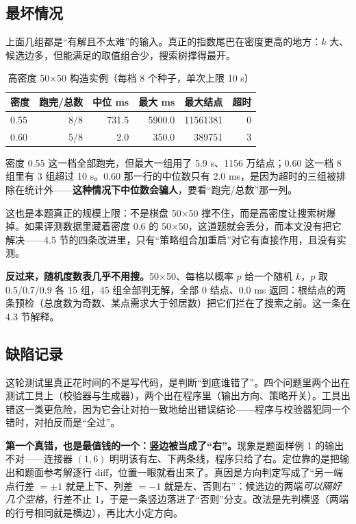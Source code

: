\documentclass[12pt,a4paper,fontset=windows]{ctexart}
\begin{document}
\subsection{最坏情况}

上面几组都是“有解且不太难”的输入。真正的指数尾巴在密度更高的地方：$k$ 大、候选边多，但能满足的取值组合少，搜索树撑得最开。

\begin{table}[htbp]
\centering
\caption{高密度 50×50 构造实例（每档 8 个种子，单次上限 10 s）}
\label{tab:hard}
\small
\begin{tabular}{lrrrrr}
\toprule
\rowcolor{gray!12}密度 & 跑完/总数 & 中位 ms & 最大 ms & 最大结点 & 超时 \\
\midrule
0.55 & 8/8 & 731.5 & 5900.0 & 11561381 & 0 \\
0.60 & 5/8 & 2.0 & 350.0 & 389751 & 3 \\
\bottomrule
\end{tabular}
\end{table}

密度 0.55 这一档全部跑完，但最大一组用了 5.9 s、1156 万结点；0.60 这一档 8 组里有 3 组超过 10 s。0.60 那一行的中位数只有 2.0 ms，是因为超时的三组被排除在统计外——\textbf{这种情况下中位数会骗人}，要看“跑完/总数”那一列。

这也是本题真正的规模上限：不是棋盘 50×50 撑不住，而是高密度让搜索树爆掉。如果评测数据里藏着密度 0.6 的 50×50，这道题就会丢分，而本文没有把它解决——4.5 节的四条改进里，只有“策略组合加重启”对它有直接作用，且没有实测。

\textbf{反过来，随机度数表几乎不用搜。}50×50、每格以概率 $p$ 给一个随机 $k$，$p$ 取 0.5/0.7/0.9 各 15 组，45 组全部判无解，全部 0 结点、0.0 ms 返回：根结点的两条预检（总度数为奇数、某点需求大于邻居数）把它们拦在了搜索之前。这一条在 4.3 节解释。

\subsection{缺陷记录}

这轮测试里真正花时间的不是写代码，是判断“到底谁错了”。四个问题里两个出在测试工具上（校验器与生成器），两个出在程序里（输出方向、策略开关）。工具出错这一类更危险，因为它会让对拍一致地给出错误结论——程序与校验器犯同一个错时，对拍反而是“全过”。

\textbf{第一个真错，也是最值钱的一个：竖边被当成了“右”。}现象是题面样例 1 的输出不对——连接器 $(1,6)$ 明明该有左、下两条线，程序只给了右。定位靠的是把输出和题面参考解逐行 diff，位置一眼就看出来了。真因是方向判定写成了“另一端点行差 $=\pm1$ 就是上下、列差 $=-1$ 就是左、否则右”：候选边的两端\emph{可以隔好几个空格}，行差不止 1，于是一条竖边落进了“否则”分支。改法是先判横竖（两端的行号相同就是横边），再比大小定方向。
\end{document}
